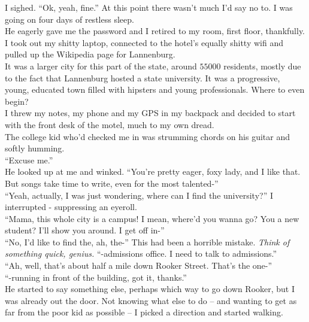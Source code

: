 \documentclass[a5paper]{scrartcl}
\begin{document}
I sighed. \enquote{Ok, yeah, fine.} At this point there wasn't much I'd say no to. I was going on four days of restless sleep.\\


He eagerly gave me the password and I retired to my room, first floor, thankfully. I took out my shitty laptop, connected to the hotel's equally shitty wifi and pulled up the Wikipedia page for Lannenburg.\\


It was a larger city for this part of the state, around $\num{55000}$ residents, mostly due to the fact that Lannenburg hosted a state university. It was a progressive, young, educated town filled with hipsters and young professionals. Where to even begin?\\


I threw my notes, my phone and my GPS in my backpack and decided to start with the front desk of the motel, much to my own dread.\\


The college kid who'd checked me in was strumming chords on his guitar and softly humming.\\


\enquote{Excuse me.}\\


He looked up at me and winked. \enquote{You're pretty eager, foxy lady, and I like that. But songs take time to write, even for the most talented-}\\


\enquote{Yeah, actually, I was just wondering, where can I find the university?} I interrupted - suppressing an eyeroll.\\


\enquote{Mama, this whole city is a campus! I mean, where'd you wanna go? You a new student? I'll show you around. I get off in-}\\


\enquote{No, I'd like to find the, ah, the-} This had been a horrible mistake. \textit{Think of something quick, genius.}
 \enquote{-admissions office. I need to talk to admissions.}\\


\enquote{Ah, well, that's about half a mile down Rooker Street. That's the one-}\\


\enquote{-running in front of the building, got it, thanks.}\\


He started to say something else, perhaps which way to go down Rooker, but I was already out the door. Not knowing what else to do -- and wanting to get as far from the poor kid as possible -- I picked a direction and started walking.\\
\end{document}
